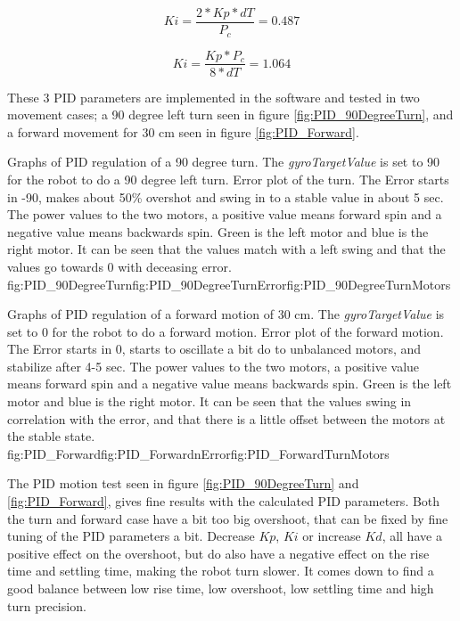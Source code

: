 $$ Ki = \frac{2*Kp*dT}{P_c} = 0.487 $$

$$ Ki = \frac{Kp*P_c}{8*dT} = 1.064 $$

These 3 PID parameters are implemented in the software and tested in two movement cases; a 90 degree left turn seen in figure \ref{fig:PID_90DegreeTurn}, and a forward movement for 30 cm seen in figure \ref{fig:PID_Forward}.


{Graphs of PID regulation of a 90 degree turn. The \emph{gyroTargetValue} is set to 90 for the robot to do a 90 degree left turn.}
{Error plot of the turn. The Error starts in -90, makes about 50\% overshot and swing in to a stable value in about 5 sec.}
{The power values to the two motors, a positive value means forward spin and a negative value means backwards spin. Green is the left motor and blue is the right motor. It can be seen that the values match with a left swing and that the values go towards 0 with deceasing error.}
{fig:PID_90DegreeTurn}{fig:PID_90DegreeTurnError}{fig:PID_90DegreeTurnMotors}

{Graphs of PID regulation of a forward motion of 30 cm. The \emph{gyroTargetValue} is set to 0 for the robot to do a forward motion.}
{Error plot of the forward motion. The Error starts in 0, starts to oscillate a bit do to unbalanced motors, and stabilize after 4-5 sec.}
{The power values to the two motors, a positive value means forward spin and a negative value means backwards spin. Green is the left motor and blue is the right motor. It can be seen that the values swing in correlation with the error, and that there is a little offset between the motors at the stable state.}
{fig:PID_Forward}{fig:PID_ForwardnError}{fig:PID_ForwardTurnMotors}

\FloatBarrier

The PID motion test seen in figure \ref{fig:PID_90DegreeTurn} and \ref{fig:PID_Forward}, gives fine results with the calculated PID parameters.
Both the turn and forward case have a bit too big overshoot, that can be fixed by fine tuning of the PID parameters a bit.
Decrease \emph{$Kp$}, \emph{$Ki$} or increase \emph{$Kd$}, all have a positive effect on the overshoot, but do also have a negative effect on the rise time and settling time, making the robot turn slower.
It comes down to find a good balance between low rise time, low overshoot, low settling time and high turn precision.

\pagebreak